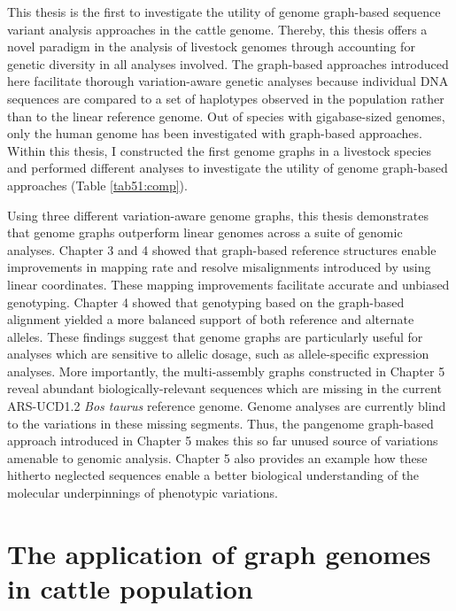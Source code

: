 \documentclass[../main.tex]{subfiles}
\begin{document}
\fi


\graphicspath{{figure/}{../figure/}}

\clearpage
\onehalfspacing

\linespread{1.25}
\setlength{\parskip}{\baselineskip}

\normalsize

This thesis is the first to investigate the utility of genome graph-based sequence variant analysis approaches in the cattle genome. Thereby, this thesis offers a novel paradigm in the analysis of livestock genomes through accounting for genetic diversity in all analyses involved. The graph-based approaches introduced here facilitate thorough variation-aware genetic analyses because individual DNA sequences are compared to a set of haplotypes observed in the population rather than to the linear reference genome. Out of species with gigabase-sized genomes, only the human genome has been investigated with graph-based approaches. Within this thesis, I constructed the first genome graphs in a livestock species and performed different analyses to investigate the utility of genome graph-based approaches (Table \ref{tab51:comp}).


Using three different variation-aware genome graphs, this thesis demonstrates that genome graphs outperform linear genomes across a suite of genomic analyses. Chapter 3 and 4 showed that graph-based reference structures enable improvements in mapping rate and resolve misalignments introduced by using linear coordinates. These mapping improvements facilitate accurate and unbiased genotyping. Chapter 4 showed that genotyping based on the graph-based alignment yielded a more balanced support of both reference and alternate alleles. These findings suggest that  genome graphs are particularly useful for analyses which are sensitive to allelic dosage, such as allele-specific expression analyses. More importantly, the multi-assembly graphs constructed in Chapter 5 reveal abundant biologically-relevant sequences which are missing in the current ARS-UCD1.2 \emph{Bos taurus} reference genome. Genome analyses are currently blind to the variations in these missing segments. Thus, the pangenome graph-based approach introduced in Chapter 5 makes this so far unused source of variations amenable to genomic analysis. Chapter 5 also provides an example how these hitherto neglected sequences enable a better biological understanding of the molecular underpinnings of phenotypic variations. 

\section{The application of graph genomes in cattle population}
\end{document}
